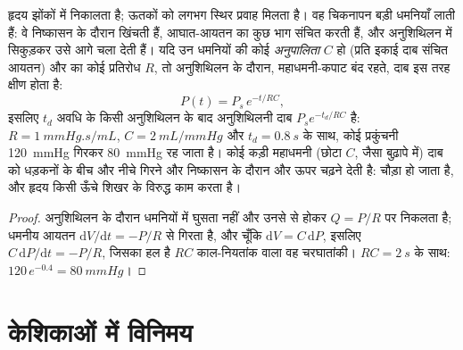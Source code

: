\begin{theorem}[प्रत्यास्थ धमनी एक जलाशय के रूप में]\label{thm:b2:blood-circulation:windkessel}
हृदय झोंकों में निकालता है; ऊतकों को लगभग स्थिर
प्रवाह मिलता है। वह चिकनापन बड़ी धमनियाँ लाती हैं: वे निष्कासन के
दौरान खिंचती हैं, आघात-आयतन का कुछ भाग संचित करती हैं, और
अनुशिथिलन में सिकुड़कर उसे आगे चला देती हैं। यदि उन धमनियों की कोई
\emph{अनुपालिता} $C$ हो (प्रति इकाई दाब संचित आयतन) और  का कोई
प्रतिरोध $R$, तो अनुशिथिलन के दौरान, महाधमनी-कपाट बंद रहते,
दाब इस तरह क्षीण होता है:
\[
P(t) = P_{s}\,e^{-t/RC},
\]
इसलिए $t_d$ अवधि के किसी अनुशिथिलन के बाद अनुशिथिलनी दाब
$P_s e^{-t_d/RC}$ है: $R = \qty{1}{mmHg.s/mL}$, $C =
\qty{2}{mL/mmHg}$ और $t_d = \qty{0.8}{s}$ के साथ, कोई प्रकुंचनी
\qty{120}{mmHg} गिरकर \qty{80}{mmHg} रह जाता है। कोई कड़ी महाधमनी (छोटा
$C$, जैसा बुढ़ापे में) दाब को धड़कनों के बीच और नीचे गिरने
और निष्कासन के दौरान और ऊपर चढ़ने देती है: \emph{} चौड़ा हो जाता है,
और हृदय किसी ऊँचे शिखर के विरुद्ध काम करता है।
\end{theorem}
\begin{proof}
अनुशिथिलन के दौरान धमनियों में  घुसता नहीं और  उनसे
 से होकर $Q = P/R$ पर निकलता है; धमनीय आयतन
$\mathrm{d}V/\mathrm{d}t = -P/R$ से गिरता है, और चूँकि $\mathrm{d}V = C\,
\mathrm{d}P$, इसलिए $C\,\mathrm{d}P/\mathrm{d}t = -P/R$, जिसका हल है
$RC$ काल-नियतांक वाला वह चरघातांकी। $RC = \qty{2}{s}$ के साथ:
$120\,e^{-0.4} = \qty{80}{mmHg}$।
\end{proof}

\section{केशिकाओं में विनिमय}

